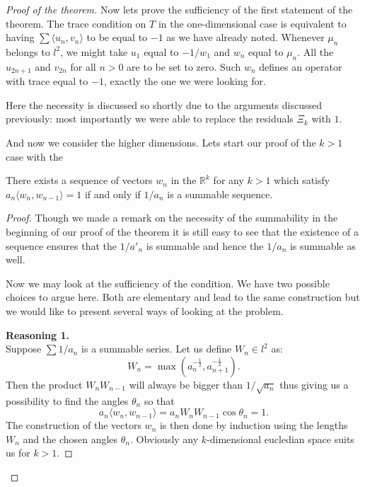 \begin{proof}[Proof of the theorem]
    Now lets prove the sufficiency of the first statement of the theorem.
    The trace condition on $T$ in the one-dimensional case is 
      equivalent to having $\sum \langle u_n, v_n\rangle $ to be equal to $-1$ as we have already noted.
    Whenever $\mu_n$ belongs to $l^2$, we might take $u_1$ equal to $-1/w_1$ and $w_n$ equal to $\mu_n$.
    All the $u_{2n+1}$ and $v_{2n}$ for all $n>0$ are to be set to zero.
    Such $w_n$ defines an operator with trace equal to $-1$, exactly the one we were looking for.
    \begin{remark}
      Here the necessity is discussed so shortly due to the arguments discussed previously: most importantly we
      were able to replace the residuals $\Xi_k$ with $1$.
    \end{remark}
    \noindent And now we consider the higher dimensions. Lets start our proof of the $k > 1$ case with the 
    \begin{prop}
      There exists a sequence of vectors $w_n$ in the $\mathbb{R}^k$ for any $k > 1$ which satisfy $a_n \langle w_n, w_{n-1} \rangle = 1$ if and only if $1/a_n$ is a summable sequence.
    \end{prop}
    \begin{proof}
      Though we made a remark on the necessity of the summability in the beginning of our proof of the theorem it is still easy to see that
        the existence of a sequence ensures that the $1/a'_n$ is summable and hence the $1/a_n$ is summable as well.
      
      Now we may look at the sufficiency of the condition.
      We have two possible choices to argue here.
      Both are elementary and lead to the same construction but we would like to present several ways of looking at the problem.

      \textbf{Reasoning 1.}\\
      Suppose $\sum 1/a_n$ is a summable series. Let us define $W_n \in l^2$ as:
      \[
        W_n = \max(a_n^{-\frac{1}{2}}, a^{-\frac{1}{2}}_{n+1}).
      \]
      Then the product $W_nW_{n-1}$ will always be bigger than $1/\sqrt{a_n}$ thus giving us a possibility to
      find the angles $\theta_n$ so that 
      \[
        a_n \langle w_n, w_{n-1} \rangle = a_n W_n W_{n-1}\cos{\theta_n} = 1.
      \]
      The construction of the vectors $w_n$ is then done by induction using the lengths $W_n$ and the chosen angles $\theta_n$.
      Obviously any $k$-dimensional eucledian space suits us for $k > 1$.


\end{proof}
\end{proof}
